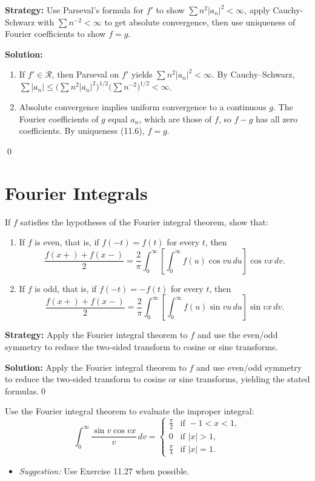 \noindent\textbf{Strategy:} Use Parseval's formula for $f'$ to show $\sum n^2|a_n|^2<\infty$, apply Cauchy-Schwarz with $\sum n^{-2}<\infty$ to get absolute convergence, then use uniqueness of Fourier coefficients to show $f=g$.

\bigskip\noindent\textbf{Solution:}
\begin{enumerate}[label=(\alph*)]
\item If $f'\in\mathcal R$, then Parseval on $f'$ yields $\sum n^2|a_n|^2<\infty$. By Cauchy–Schwarz, $\sum |a_n|\le\big(\sum n^2|a_n|^2\big)^{1/2}\big(\sum n^{-2}\big)^{1/2}<\infty$.
\item Absolute convergence implies uniform convergence to a continuous $g$. The Fourier coefficients of $g$ equal $a_n$, which are those of $f$, so $f-g$ has all zero coefficients. By uniqueness (11.6), $f=g$.
\end{enumerate}\qed
\section{Fourier Integrals}



\begin{problembox}
If $f$ satisfies the hypotheses of the Fourier integral theorem, show that:
\begin{enumerate}[label=(\alph*)]
\item If $f$ is even, that is, if $f(-t) = f(t)$ for every $t$, then
\[
\frac{f(x+) + f(x-)}{2} = \frac{2}{\pi} \int_0^\infty \left[ \int_0^\infty f(u) \cos vu \, du \right] \cos vx \, dv.
\]
\item If $f$ is odd, that is, if $f(-t) = -f(t)$ for every $t$, then
\[
\frac{f(x+) + f(x-)}{2} = \frac{2}{\pi} \int_0^\infty \left[ \int_0^\infty f(u) \sin vu \, du \right] \sin vx \, dv.
\]
\end{enumerate}
\end{problembox}

\noindent\textbf{Strategy:} Apply the Fourier integral theorem to $f$ and use the even/odd symmetry to reduce the two-sided transform to cosine or sine transforms.

\bigskip\noindent\textbf{Solution:}
Apply the Fourier integral theorem to $f$ and use even/odd symmetry to reduce the two-sided transform to cosine or sine transforms, yielding the stated formulas.\qed


\begin{problembox}
Use the Fourier integral theorem to evaluate the improper integral:
\[
\int_0^\infty \frac{\sin v \cos vx}{v} \, dv = 
\begin{cases} 
\frac{\pi}{2} & \text{if } -1 < x < 1, \\
0 & \text{if } |x| > 1, \\
\frac{\pi}{4} & \text{if } |x| = 1.
\end{cases}
\]
\begin{itemize}
\item \textit{Suggestion:} Use Exercise 11.27 when possible.
\end{itemize}
\end{problembox}

